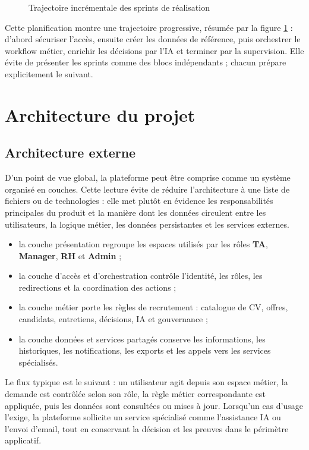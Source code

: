\begin{figure}[H]
  \centering
  \caption{\label{fig:sprint-roadmap}Trajectoire incrémentale des sprints de réalisation}
\end{figure}

Cette planification montre une trajectoire progressive, résumée par la figure \ref{fig:sprint-roadmap} : d'abord sécuriser l'accès, ensuite créer les données de référence, puis orchestrer le workflow métier, enrichir les décisions par l'IA et terminer par la supervision. Elle évite de présenter les sprints comme des blocs indépendants ; chacun prépare explicitement le suivant.

\section{Architecture du projet}

\subsection{Architecture externe}
D'un point de vue global, la plateforme peut être comprise comme un système organisé en couches. Cette lecture évite de réduire l'architecture à une liste de fichiers ou de technologies : elle met plutôt en évidence les responsabilités principales du produit et la manière dont les données circulent entre les utilisateurs, la logique métier, les données persistantes et les services externes.
\begin{itemize}
  \item la couche présentation regroupe les espaces utilisés par les rôles \textbf{TA}, \textbf{Manager}, \textbf{RH} et \textbf{Admin} ;
  \item la couche d'accès et d'orchestration contrôle l'identité, les rôles, les redirections et la coordination des actions ;
  \item la couche métier porte les règles de recrutement : catalogue de CV, offres, candidats, entretiens, décisions, IA et gouvernance ;
  \item la couche données et services partagés conserve les informations, les historiques, les notifications, les exports et les appels vers les services spécialisés.
\end{itemize}

Le flux typique est le suivant : un utilisateur agit depuis son espace métier, la demande est contrôlée selon son rôle, la règle métier correspondante est appliquée, puis les données sont consultées ou mises à jour. Lorsqu'un cas d'usage l'exige, la plateforme sollicite un service spécialisé comme l'assistance IA ou l'envoi d'email, tout en conservant la décision et les preuves dans le périmètre applicatif.

